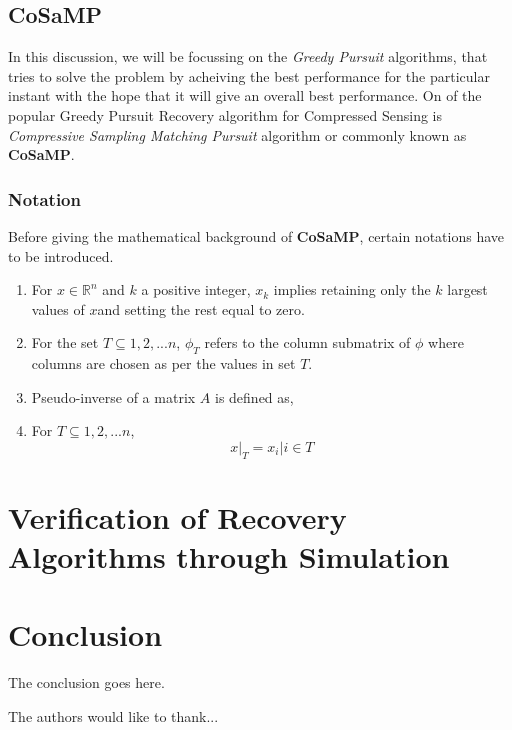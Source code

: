 \documentclass[12pt]{article}
\theoremstyle{definition}
\def\x{$x$\hspace{0.1in}}
\def\cosamp{\textbf{CoSaMP}\hspace{0.1in}}
\begin{document}
\subsection{CoSaMP}
In this discussion, we will be focussing on the \textit{Greedy Pursuit} algorithms, that tries to solve the problem
by acheiving the best performance for the particular instant with the hope that it will give an overall best performance.
On of the popular Greedy Pursuit Recovery algorithm for Compressed Sensing is \textit{Compressive Sampling
Matching Pursuit} algorithm or commonly known as \cosamp.

\subsubsection{Notation}
Before giving the mathematical background of \cosamp, certain notations have to be introduced.
\begin{enumerate}
  \item For $x \in \mathbb{R}^n$ and $k$ a positive integer, $x_k$ implies retaining only the $k$ largest
values of \x and setting the rest equal to zero.
  
  \item For the set $T \subseteq {1,2,...n}$, $\phi_T$ refers to the column submatrix of $\phi$ where columns
  are chosen as per the values in set $T$.
  
  \item Pseudo-inverse of a matrix $A$ is defined as, 
  \item For $T \subseteq {1,2,...n}$,
  \begin{equation}
   x|_T = {x_i| i \in T}
  \end{equation}

\end{enumerate}


\section{Verification of Recovery Algorithms through Simulation}
\section{Conclusion}
The conclusion goes here.

The authors would like to thank...\cite{Whitmore-survey} \cite{Huang-DGS}




\end{document}
